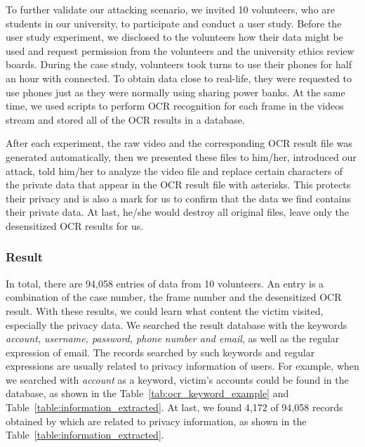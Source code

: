 \iffalse

To further validate our attacking scenario, we invited 10 volunteers, who are students in our university, to participate and conduct a user study.
Before the user study experiment, we disclosed to the volunteers how their data might be used and request permission from the volunteers and the university ethics review boards.
During the case study, volunteers took turns to use their phones for half an hour with \tool connected.
To obtain data close to real-life, they were requested to use phones just as they were normally using sharing power banks.
At the same time, we used scripts to perform \ac{OCR} recognition for each frame in the videos stream and stored all of the \ac{OCR} results in a database.

After each experiment, the raw video and the corresponding \ac{OCR} result file was generated automatically, then we presented these files to him/her, introduced our attack, told him/her to analyze the video file and replace certain characters of the private data that appear in the \ac{OCR} result file with asterisks. This protects their privacy and is also a mark for us to confirm that the data we find contains their private data. At last, he/she would destroy all original files, leave only the desensitized \ac{OCR} results for us.


\subsubsection{Result}

In total, there are 94,058 entries of data from 10 volunteers. An entry is a combination of the case number, the frame number and the desensitized \ac{OCR} result.
With these results, we could learn what content the victim visited, especially the privacy data.
We searched the result database with the keywords \textit{account, username, password, phone number and email}, as well as the regular expression of email.
The records searched by such keywords and regular expressions are usually related to privacy information of users.
For example, when we searched with \textit{account} as a keyword, victim's accounts could be found in the database, as shown in the Table~\ref{tab:ocr_keyword_example} and Table~\ref{table:information_extracted}.
At last, we found 4,172 of 94,058 records obtained by \tool which are related to privacy information, as shown in the Table~\ref{table:information_extracted}.


